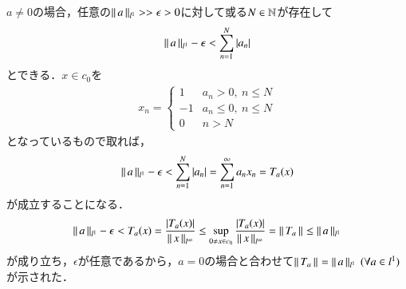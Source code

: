 \begin{prf}
\begin{description}
		$a \neq 0$の場合，任意の$\left\|\, a\, \right\|_{l^1} >> \epsilon >0$に対して或る$N \in \mathbb{N}$が存在して
		\begin{align}
			\left\|\, a\, \right\|_{l^1} - \epsilon < \sum_{n = 1}^{N} |a_n|
		\end{align}
		とできる．$x \in c_0$を
		\begin{align}
			x_n = \begin{cases}
				1 & a_n > 0,\ n \leq N \\
				-1 & a_n \leq 0,\ n \leq N \\
				0 & n > N
			\end{cases}
		\end{align}
		となっているもので取れば，
		\begin{align}
			\left\|\, a\, \right\|_{l^1} - \epsilon < \sum_{n = 1}^{N} |a_n| = \sum_{n = 1}^{\infty} a_n x_n = T_a(x)
		\end{align}
		が成立することになる．
		\begin{align}
			\left\|\, a\, \right\|_{l^1} - \epsilon < T_a(x) = \frac{|T_a(x)|}{\left\|\, x\, \right\|_{l^{\infty}}} \leq \operatorname*{sup}_{0 \neq x \in c_0} \frac{|T_a(x)|}{\left\|\, x\, \right\|_{l^{\infty}}} = \left\|\, T_a\, \right\|_{} \leq \left\|\, a\, \right\|_{l^1}
		\end{align}
		が成り立ち，$\epsilon$が任意であるから，$a=0$の場合と合わせて$\left\|\, T_a\, \right\|_{} = \left\|\, a\, \right\|_{l^1}\ (\forall a \in l^1)$が示された．
	

\end{description}
\end{prf}
